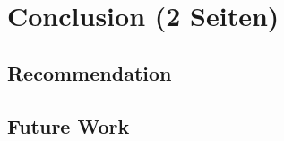 \documentclass[ExampleMasters.tex]{subfiles}
\begin{document}
\clearpage
\chapter{Conclusion (2 Seiten)}
\label{chap:conclusion}

\section{Recommendation}
\label{sec:recommendation}
\section{Future Work}
\label{sec:future_work}
\end{document}
